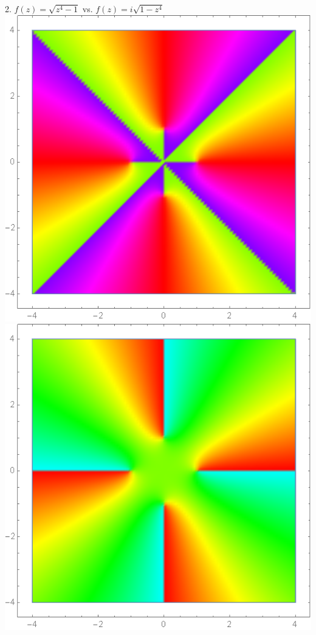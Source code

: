 \begin{center}
    2. $f(z) = \sqrt{z^4-1}$ vs. $f(z) = i\sqrt{1-z^4}$ \\
    \includegraphics[scale=0.27]{images/poszfourminus1.png}
    \includegraphics[scale=0.27]{images/negzfourminus1.png}
\end{center}
